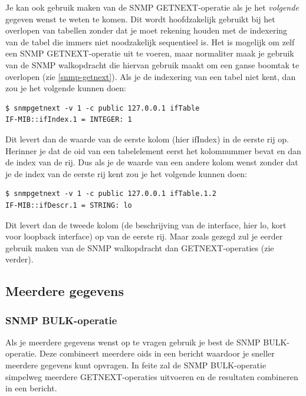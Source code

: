 Je kan ook gebruik maken van de SNMP GETNEXT-operatie als je het \emph{volgende} gegeven wenst te weten te komen.
Dit wordt hoofdzakelijk gebruikt bij het overlopen van tabellen zonder dat je moet rekening houden met de indexering van de tabel
die immers niet noodzakelijk sequentieel is.
Het is mogelijk om zelf een SNMP GETNEXT-operatie uit te voeren, maar normaliter maak je gebruik van de SNMP walkopdracht die
hiervan gebruik maakt om een ganse boomtak te overlopen (zie \cref{snmp-getnext}).
Als je de indexering van een tabel niet kent, dan zou je het volgende kunnen doen:

\begin{lstlisting}[float=h, caption={SNMP GETNEXT-opdracht op een tabel}, label=netsnmp-getnext]
$ snmpgetnext -v 1 -c public 127.0.0.1 ifTable
IF-MIB::ifIndex.1 = INTEGER: 1
\end{lstlisting}

Dit levert dan de waarde van de eerste kolom (hier ifIndex) in de eerste rij op.
Herinner je dat de \gls{oid} van een tabelelement eerst het kolomnummer bevat en dan de index van de rij.
Dus als je de waarde van een andere kolom wenst zonder dat je de index van de eerste rij kent zou je het volgende kunnen doen:

\begin{lstlisting}[float=h, caption={SNMP GETNEXT-opdracht op een kolom van een tabel}, label=netsnmp-getnextcol]
$ snmpgetnext -v 1 -c public 127.0.0.1 ifTable.1.2
IF-MIB::ifDescr.1 = STRING: lo
\end{lstlisting}

Dit levert dan de tweede kolom (de beschrijving van de interface, hier lo, kort voor loopback interface) op van de eerste rij.
Maar zoals gezegd zul je eerder gebruik maken van de SNMP walkopdracht dan GETNEXT-operaties (zie verder).


\subsection{Meerdere gegevens}

\subsubsection{SNMP BULK-operatie}
Als je meerdere gegevens wenst op te vragen gebruik je best de SNMP BULK-operatie.
Deze combineert meerdere \glspl{oid} in een bericht waardoor je sneller meerdere gegevens kunt opvragen.
In feite zal de SNMP BULK-operatie simpelweg meerdere GETNEXT-operaties uitvoeren en de resultaten combineren in een bericht.


